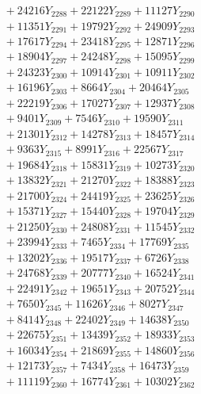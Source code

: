 \documentclass[a4paper,10pt]{article}
\begin{document}
{\begin{align}
&\;  + 24216 Y_{2288} + 22122 Y_{2289} + 11127 Y_{2290} \\[0.3ex]
&\;  + 11351 Y_{2291} + 19792 Y_{2292} + 24909 Y_{2293} \\[0.3ex]
&\;  + 17617 Y_{2294} + 23418 Y_{2295} + 12871 Y_{2296} \\[0.3ex]
&\;  + 18904 Y_{2297} + 24248 Y_{2298} + 15095 Y_{2299} \\[0.3ex]
&\;  + 24323 Y_{2300} + 10914 Y_{2301} + 10911 Y_{2302} \\[0.3ex]
&\;  + 16196 Y_{2303} + 8664 Y_{2304} + 20464 Y_{2305} \\[0.3ex]
&\;  + 22219 Y_{2306} + 17027 Y_{2307} + 12937 Y_{2308} \\[0.5ex]\allowbreak
&\;  + 9401 Y_{2309} + 7546 Y_{2310} + 19590 Y_{2311} \\[0.3ex]
&\;  + 21301 Y_{2312} + 14278 Y_{2313} + 18457 Y_{2314} \\[0.3ex]
&\;  + 9363 Y_{2315} + 8991 Y_{2316} + 22567 Y_{2317} \\[0.3ex]
&\;  + 19684 Y_{2318} + 15831 Y_{2319} + 10273 Y_{2320} \\[0.3ex]
&\;  + 13832 Y_{2321} + 21270 Y_{2322} + 18388 Y_{2323} \\[0.3ex]
&\;  + 21700 Y_{2324} + 24419 Y_{2325} + 23625 Y_{2326} \\[0.3ex]
&\;  + 15371 Y_{2327} + 15440 Y_{2328} + 19704 Y_{2329} \\[0.3ex]
&\;  + 21250 Y_{2330} + 24808 Y_{2331} + 11545 Y_{2332} \\[0.3ex]
&\;  + 23994 Y_{2333} + 7465 Y_{2334} + 17769 Y_{2335} \\[0.3ex]
&\;  + 13202 Y_{2336} + 19517 Y_{2337} + 6726 Y_{2338} \\[0.5ex]\allowbreak
&\;  + 24768 Y_{2339} + 20777 Y_{2340} + 16524 Y_{2341} \\[0.3ex]
&\;  + 22491 Y_{2342} + 19651 Y_{2343} + 20752 Y_{2344} \\[0.3ex]
&\;  + 7650 Y_{2345} + 11626 Y_{2346} + 8027 Y_{2347} \\[0.3ex]
&\;  + 8414 Y_{2348} + 22402 Y_{2349} + 14638 Y_{2350} \\[0.3ex]
&\;  + 22675 Y_{2351} + 13439 Y_{2352} + 18933 Y_{2353} \\[0.3ex]
&\;  + 16034 Y_{2354} + 21869 Y_{2355} + 14860 Y_{2356} \\[0.3ex]
&\;  + 12173 Y_{2357} + 7434 Y_{2358} + 16473 Y_{2359} \\[0.3ex]
&\;  + 11119 Y_{2360} + 16774 Y_{2361} + 10302 Y_{2362} \\[0.3ex]

\end{align}}
\end{document}
